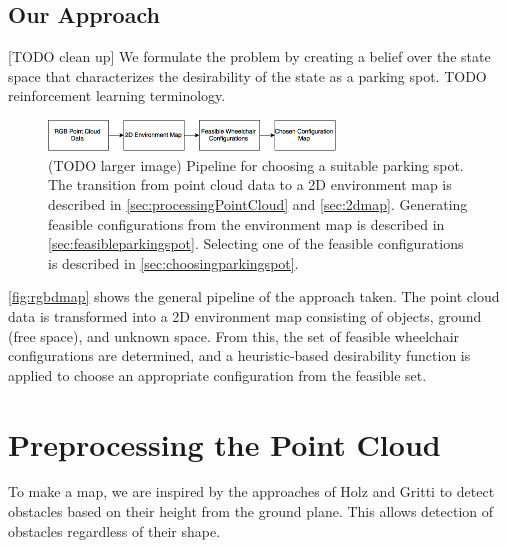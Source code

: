 \subsection{Our Approach}

[TODO clean up]
We formulate the problem by creating a belief over the state space
that characterizes the desirability of the state as a parking spot.
TODO reinforcement learning terminology.


\begin{figure}
\centering
\includegraphics[width=3in]{figures/rgbdmap.png}
\caption{(TODO larger image) Pipeline for choosing a suitable parking spot.
The transition from point cloud data to a 2D environment map is described in
\autoref{sec:processingPointCloud} and \autoref{sec:2dmap}. Generating feasible configurations from the
environment map is described in \autoref{sec:feasibleparkingspot}. Selecting one
of the feasible configurations is described in
\autoref{sec:choosingparkingspot}.}
\label{fig:rgbdmap}
\end{figure}

\autoref{fig:rgbdmap} shows the general pipeline of the approach taken. The
point cloud data is transformed into a 2D environment map consisting of objects,
ground (free space), and unknown space. From this, the set of feasible
wheelchair configurations are determined, and a heuristic-based desirability
function is applied to choose an appropriate configuration from the feasible set.





\section{Preprocessing the Point Cloud}
\label{sec:processingPointCloud}
To make a map, we are inspired by the approaches of Holz \cite{holz2013towards}
and Gritti \cite{gritti2014kinect} to detect obstacles based on their height
from the ground plane. This allows detection of obstacles regardless of
their shape.


